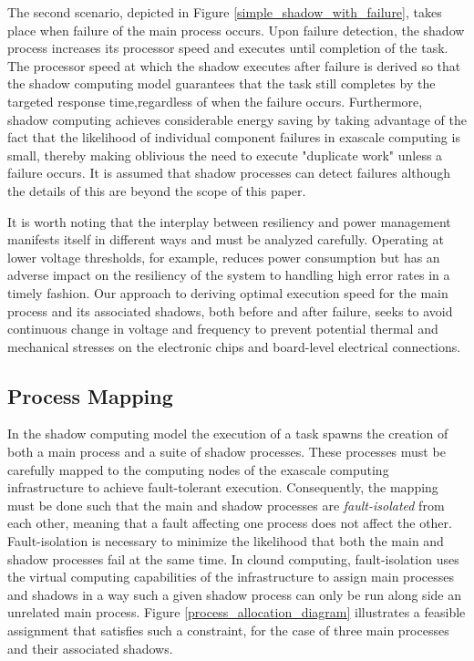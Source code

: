 The second scenario, depicted in Figure
\ref{simple_shadow_with_failure}, takes place when failure of the main
process occurs. Upon failure detection, the shadow process increases
its processor speed and executes until completion of the task.  The
processor speed at which the shadow executes after failure is derived
so that the shadow computing model guarantees that the task still
completes by the targeted response time,regardless of when the failure
occurs. Furthermore, shadow computing achieves considerable energy
saving by taking advantage of the fact that the likelihood of
individual component failures in exascale computing is small, thereby
making oblivious the need to execute "duplicate work" unless a failure
occurs. It is assumed that shadow processes can detect failures
although the details of this are beyond the scope of this paper.


It is worth noting that the interplay between resiliency and power
management manifests itself in different ways and must be analyzed
carefully. Operating at lower voltage thresholds, for example, reduces
power consumption but has an adverse impact on the resiliency of the
system to handling high error rates in a timely fashion. Our approach
to deriving optimal execution speed for the main process and its
associated shadows, both before and after failure, seeks to avoid
continuous change in voltage and frequency to prevent potential
thermal and mechanical stresses on the electronic chips and
board-level electrical connections.


\subsection{Process Mapping}

In the shadow computing model the execution of a task spawns the
creation of both a main process and a suite of shadow processes. These
processes must be carefully mapped to the computing nodes of the
exascale computing infrastructure to achieve fault-tolerant execution.
Consequently, the mapping must be done such that the main and shadow
processes are {\it fault-isolated} from each other, meaning that a
fault affecting one process does not affect the other. Fault-isolation
is necessary to minimize the likelihood that both the main and shadow
processes fail at the same time. In clound computing, fault-isolation
uses the virtual computing capabilities of the infrastructure to
assign main processes and shadows in a way such a given shadow process
can only be run along side an unrelated main process.  Figure
\ref{process_allocation_diagram} illustrates a feasible assignment
that satisfies such a constraint, for the case of three main processes
and their associated shadows.

